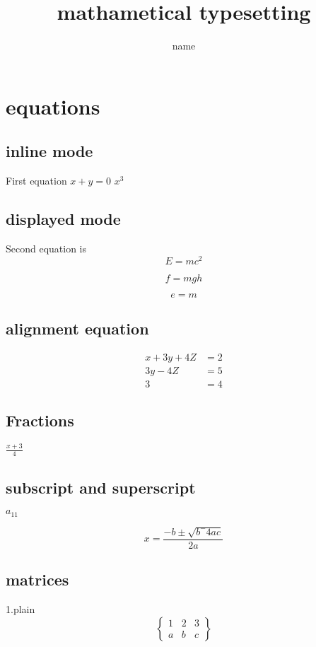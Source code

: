 \documentclass[12pt]{book}
\begin{document}
	\title{mathametical typesetting}
\author{name}
\maketitle
\chapter{equations}

\section{inline mode}
 First equation $ x+y =0 $  $ x^3 $	
\section{displayed mode}
Second equation is $$ E=mc^2 $$


\begin{displaymath}
 f=mgh 
\end{displaymath}

	
\begin{equation}
e=m
\end{equation}

	
\section{alignment equation}
\begin{align}
x+3y+4Z &=2\\
3y-4Z&=5 \\
3 &=4
\end{align}


\section{Fractions}
$\frac{x+3}{4}$
\section{subscript and superscript}
$ a_{11} $
	
	$$ x= \frac{-b\pm\sqrt{b^-4ac}}{2a} $$ 
	\section{matrices}
	1.plain
	$$
	\begin{Bmatrix}
	1&2&3\\
	a&b&c
		\end{Bmatrix}
		$$
	
\end{document}
